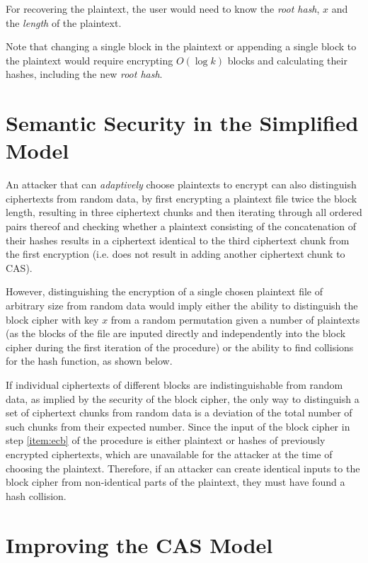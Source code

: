 \documentclass{llncs}
\begin{document}
For recovering the plaintext, the user would need to know the {\em root 
hash}, $x$ and the {\em length} of the plaintext.

Note that changing a single block in the plaintext or appending a single 
block to the plaintext would require encrypting $O(\log k)$ blocks and
calculating their hashes, including the new {\em root hash}.

\section{Semantic Security in the Simplified Model}\label{sec:Result}

An attacker that can {\em adaptively} choose plaintexts to encrypt can 
also distinguish ciphertexts from random data, by first encrypting a 
plaintext file twice the block length, resulting in three ciphertext 
chunks and then iterating through all ordered pairs thereof and checking 
whether a plaintext consisting of the concatenation of their hashes 
results in a ciphertext identical to the third ciphertext chunk from the 
first encryption (i.e. does not result in adding another ciphertext 
chunk to CAS).

However, distinguishing the encryption of a single chosen plaintext file 
of arbitrary size from random data would imply either the ability to 
distinguish the block cipher with key $x$ from a random permutation 
given a number of plaintexts (as the blocks of the file are inputed 
directly and independently into the block cipher during the first 
iteration of the procedure) or the ability to find collisions for the 
hash function, as shown below.

If individual ciphertexts of different blocks are indistinguishable from 
random data, as implied by the security of the block cipher, the only 
way to distinguish a set of ciphertext chunks from random data is a 
deviation of the total number of such chunks from their expected number. 
Since the input of the block cipher in step \ref{item:ecb} of the 
procedure is either plaintext or hashes of previously encrypted 
ciphertexts, which are unavailable for the attacker at the time of 
choosing the plaintext. Therefore, if an attacker can create identical 
inputs to the block cipher from non-identical parts of the plaintext, 
they must have found a hash collision.

\section{Improving the CAS Model}
\end{document}

